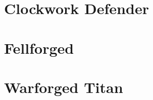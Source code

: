 	{}		%
	{}		%
	{}		%
	{}		%
	{}		%
	{}		%
	{}		%
	{}		%
	



\vfill\eject
\section*{Clockwork Defender}

\vfill\eject
\section*{Fellforged}

\vfill\eject
\section*{Warforged Titan}
